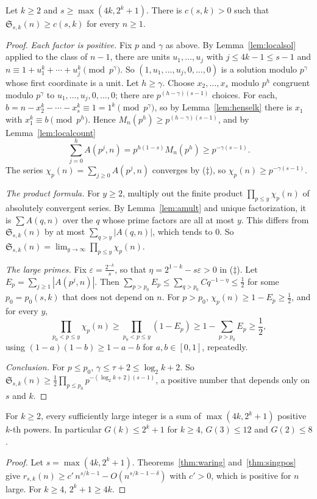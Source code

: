 \begin{theorem}\label{thm:singpos}
Let $k\ge2$ and $s\ge\max(4k,2^k+1)$. There is $c(s,k)>0$ such that $\mathfrak S_{s,k}(n)\ge c(s,k)$ for every $n\ge1$.
\end{theorem}
\begin{proof}
\emph{Each factor is positive.} Fix $p$ and $\gamma$ as above. By Lemma~\ref{lem:localsol} applied to the class of $n-1$, there are units $u_1,\dots,u_j$ with $j\le4k-1\le s-1$ and $n\equiv1+u_1^k+\cdots+u_j^k\pmod{p^\gamma}$. So $(1,u_1,\dots,u_j,0,\dots,0)$ is a solution modulo $p^\gamma$ whose first coordinate is a unit. Let $h\ge\gamma$. Choose $x_2,\dots,x_s$ modulo $p^h$ congruent modulo $p^\gamma$ to $u_1,\dots,u_j,0,\dots,0$; there are $p^{(h-\gamma)(s-1)}$ choices. For each, $b=n-x_2^k-\cdots-x_s^k\equiv1=1^k\pmod{p^\gamma}$, so by Lemma~\ref{lem:henselk} there is $x_1$ with $x_1^k\equiv b\pmod{p^h}$. Hence $M_n(p^h)\ge p^{(h-\gamma)(s-1)}$, and by Lemma~\ref{lem:localcount}
\[
\sum_{j=0}^hA(p^j,n)=p^{h(1-s)}M_n(p^h)\ge p^{-\gamma(s-1)}.
\]
The series $\chi_p(n)=\sum_{j\ge0}A(p^j,n)$ converges by ($\ddagger$), so $\chi_p(n)\ge p^{-\gamma(s-1)}$.

\emph{The product formula.} For $y\ge2$, multiply out the finite product $\prod_{p\le y}\chi_p(n)$ of absolutely convergent series. By Lemma~\ref{lem:amult} and unique factorization, it is $\sum A(q,n)$ over the $q$ whose prime factors are all at most $y$. This differs from $\mathfrak S_{s,k}(n)$ by at most $\sum_{q>y}|A(q,n)|$, which tends to $0$. So $\mathfrak S_{s,k}(n)=\lim_{y\to\infty}\prod_{p\le y}\chi_p(n)$.

\emph{The large primes.} Fix $\varepsilon=\frac{2^{-k}}s$, so that $\eta=2^{1-k}-s\varepsilon>0$ in ($\ddagger$). Let $E_p=\sum_{j\ge1}|A(p^j,n)|$. Then $\sum_{p>p_0}E_p\le\sum_{q>p_0}Cq^{-1-\eta}\le\frac12$ for some $p_0=p_0(s,k)$ that does not depend on $n$. For $p>p_0$, $\chi_p(n)\ge1-E_p\ge\frac12$, and for every $y$,
\[
\prod_{p_0<p\le y}\chi_p(n)\ge\prod_{p_0<p\le y}(1-E_p)\ge1-\sum_{p>p_0}E_p\ge\frac12,
\]
using $(1-a)(1-b)\ge1-a-b$ for $a,b\in[0,1]$, repeatedly.

\emph{Conclusion.} For $p\le p_0$, $\gamma\le\tau+2\le\log_2k+2$. So $\mathfrak S_{s,k}(n)\ge\frac12\prod_{p\le p_0}p^{-(\log_2k+2)(s-1)}$, a positive number that depends only on $s$ and $k$.
\end{proof}

\begin{corollary}\label{cor:gk}
For $k\ge2$, every sufficiently large integer is a sum of $\max(4k,2^k+1)$ positive $k$-th powers. In particular $G(k)\le2^k+1$ for $k\ge4$, $G(3)\le12$ and $G(2)\le8$.
\end{corollary}
\begin{proof}
Let $s=\max(4k,2^k+1)$. Theorems~\ref{thm:waring} and~\ref{thm:singpos} give $r_{s,k}(n)\ge c'\,n^{s/k-1}-O(n^{s/k-1-\delta})$ with $c'>0$, which is positive for $n$ large. For $k\ge4$, $2^k+1\ge4k$.
\end{proof}


